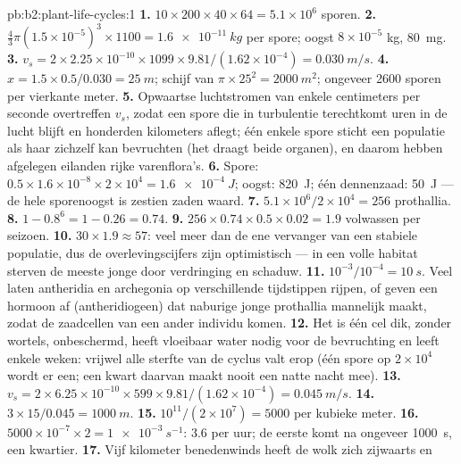\begin{solution}{pb:b2:plant-life-cycles:1}
\textbf{1.} $10\times 200\times 40\times 64 = 5.1\times 10^{6}$
sporen.
\textbf{2.} $\tfrac43\pi(1.5\times 10^{-5})^3\times 1100 =
\qty{1.6e-11}{kg}$ per spore; oogst $8\times 10^{-5}$ kg, \qty{80}{mg}.
\textbf{3.} $v_s = 2\times 2.25\times 10^{-10}\times 1099\times
9.81/(1.62\times 10^{-4}) = \qty{0.030}{m/s}$.
\textbf{4.} $x = 1.5\times 0.5/0.030 = \qty{25}{m}$; schijf van
$\pi\times 25^2 = \qty{2000}{m^2}$; ongeveer \num{2600} sporen per
vierkante meter.
\textbf{5.} Opwaartse luchtstromen van enkele centimeters per seconde
overtreffen $v_s$, zodat een spore die in turbulentie terechtkomt uren in
de lucht blijft en honderden kilometers aflegt; één enkele spore sticht
een populatie als haar  zichzelf kan bevruchten (het draagt
beide organen), en daarom hebben afgelegen eilanden rijke varenflora's.
\textbf{6.} Spore: $0.5\times 1.6\times 10^{-8}\times 2\times 10^{4} =
\qty{1.6e-4}{J}$; oogst: \qty{820}{J}; één dennenzaad: \qty{50}{J} ---
de hele sporenoogst is zestien zaden waard.
\textbf{7.} $5.1\times 10^{6}/2\times 10^{4} = 256$ prothallia.
\textbf{8.} $1 - 0.8^{6} = 1 - 0.26 = 0.74$.
\textbf{9.} $256\times 0.74\times 0.5\times 0.02 = 1.9$ volwassen 
per seizoen.
\textbf{10.} $30\times 1.9 \approx 57$: veel meer dan de ene vervanger van
een stabiele populatie, dus de overlevingscijfers zijn optimistisch ---
in een volle habitat sterven de meeste jonge  door verdringing
en schaduw.
\textbf{11.} $10^{-3}/10^{-4} = \qty{10}{s}$. Veel  laten
antheridia en archegonia op verschillende tijdstippen rijpen, of geven een
hormoon af (antheridiogeen) dat naburige jonge prothallia mannelijk maakt,
zodat de zaadcellen van een ander individu komen.
\textbf{12.} Het is één cel dik, zonder wortels, onbeschermd, heeft
vloeibaar water nodig voor de bevruchting en leeft enkele weken: vrijwel
alle sterfte van de cyclus valt erop (één spore op $2\times 10^{4}$ wordt
er een; een kwart daarvan maakt nooit een natte nacht mee).
\textbf{13.} $v_s = 2\times 6.25\times 10^{-10}\times 599\times
9.81/(1.62\times 10^{-4}) = \qty{0.045}{m/s}$.
\textbf{14.} $3\times 15/0.045 = \qty{1000}{m}$.
\textbf{15.} $10^{11}/(2\times 10^{7}) = \num{5000}$ per kubieke meter.
\textbf{16.} $5000\times 10^{-7}\times 2 = \qty{1e-3}{s^{-1}}$: 3.6 per
uur; de eerste komt na ongeveer \qty{1000}{s}, een kwartier.
\textbf{17.} Vijf kilometer benedenwinds heeft de wolk zich zijwaarts en

\end{solution}
